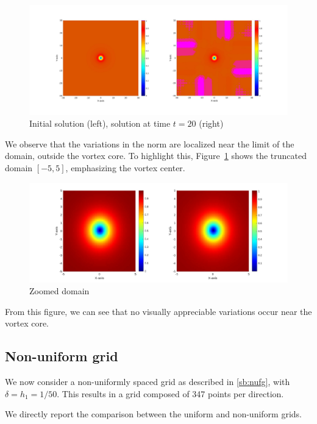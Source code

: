 \begin{figure}[H]
    \centering
    \includegraphics[width=\textwidth]{img/ltufd20t347s30L_color.pdf}
    \caption{Initial solution (left), solution at time $t = 20$ (right)}
\end{figure}

We observe that the variations in the norm are localized near the limit of the domain, outside the vortex core. To highlight this, Figure~\ref{fig:vortex_center} shows the truncated domain $[-5,5]$, emphasizing the vortex center.

\begin{figure}[H]
    \centering
    \includegraphics[width=\textwidth]{img/ltufd20t347s30L_5.pdf}
    \caption{Zoomed domain}
    \label{fig:vortex_center}
\end{figure}

From this figure, we can see that no visually appreciable variations occur near the vortex core.

\subsection{Non-uniform grid}

We now consider a non-uniformly spaced grid as described in \ref{sb:nufg}, with $\delta = h_1 = 1/50$. This results in a grid composed of 347 points per direction.

We directly report the comparison between the uniform and non-uniform grids.

